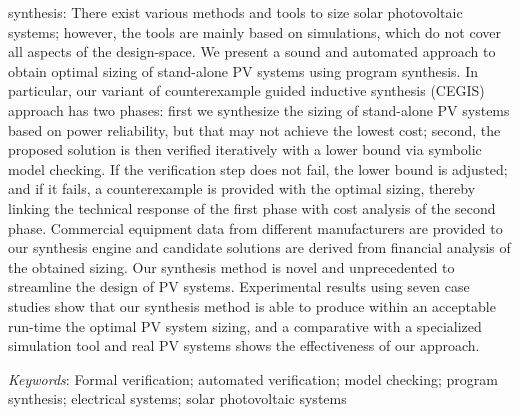synthesis:
There exist various methods and tools to size solar photovoltaic systems; however, the tools are mainly based on simulations, which do not cover all aspects of the design-space. We present a sound and automated approach to obtain optimal sizing of stand-alone PV systems using program synthesis. In particular, our variant of counterexample guided inductive synthesis (CEGIS) approach has two phases: first we synthesize the sizing of stand-alone PV systems based on power reliability, but that may not achieve the lowest cost; second, the proposed solution is then verified iteratively with a lower bound via symbolic model checking. If the verification step does not fail, the lower bound is adjusted; and if it fails, a counterexample is provided with the optimal sizing, thereby linking the technical response of the first phase with cost analysis of the second phase. Commercial equipment data from different manufacturers are provided to our synthesis engine and candidate solutions are derived from financial analysis of the obtained sizing. Our synthesis method is novel and unprecedented to streamline the design of PV systems. Experimental results using seven case studies show that our synthesis method is able to produce within an acceptable run-time the optimal PV system sizing, and a comparative with a specialized simulation tool and real PV systems shows the effectiveness of our approach.




\textit{Keywords}: Formal verification; automated verification; model checking; program synthesis; electrical systems; solar photovoltaic systems
